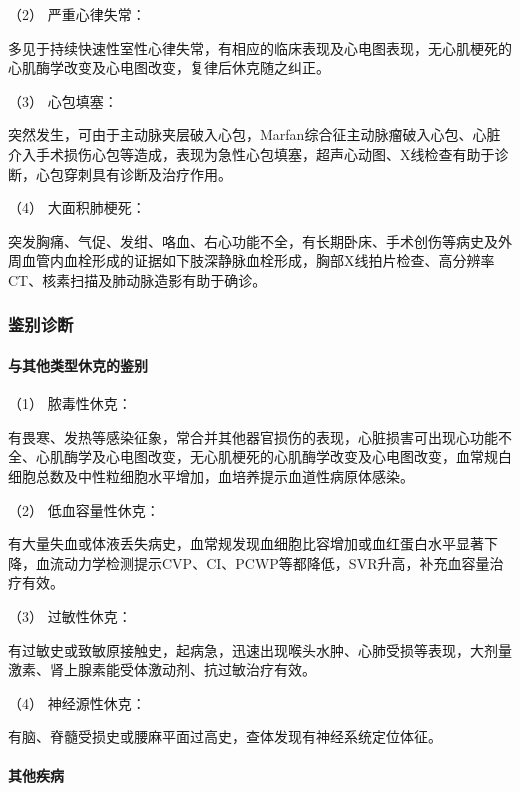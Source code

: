 \hypertarget{text00059.htmlux5cux23CHP2-3-2-3-3-2}{}
（2） 严重心律失常：

多见于持续快速性室性心律失常，有相应的临床表现及心电图表现，无心肌梗死的心肌酶学改变及心电图改变，复律后休克随之纠正。

\hypertarget{text00059.htmlux5cux23CHP2-3-2-3-3-3}{}
（3） 心包填塞：

突然发生，可由于主动脉夹层破入心包，Marfan综合征主动脉瘤破入心包、心脏介入手术损伤心包等造成，表现为急性心包填塞，超声心动图、X线检查有助于诊断，心包穿刺具有诊断及治疗作用。

\hypertarget{text00059.htmlux5cux23CHP2-3-2-3-3-4}{}
（4） 大面积肺梗死：

突发胸痛、气促、发绀、咯血、右心功能不全，有长期卧床、手术创伤等病史及外周血管内血栓形成的证据如下肢深静脉血栓形成，胸部X线拍片检查、高分辨率CT、核素扫描及肺动脉造影有助于确诊。

\subsubsection{鉴别诊断}

\paragraph{与其他类型休克的鉴别}

\hypertarget{text00059.htmlux5cux23CHP2-3-2-4-1-1}{}
（1） 脓毒性休克：

有畏寒、发热等感染征象，常合并其他器官损伤的表现，心脏损害可出现心功能不全、心肌酶学及心电图改变，无心肌梗死的心肌酶学改变及心电图改变，血常规白细胞总数及中性粒细胞水平增加，血培养提示血道性病原体感染。

\hypertarget{text00059.htmlux5cux23CHP2-3-2-4-1-2}{}
（2） 低血容量性休克：

有大量失血或体液丢失病史，血常规发现血细胞比容增加或血红蛋白水平显著下降，血流动力学检测提示CVP、CI、PCWP等都降低，SVR升高，补充血容量治疗有效。

\hypertarget{text00059.htmlux5cux23CHP2-3-2-4-1-3}{}
（3） 过敏性休克：

有过敏史或致敏原接触史，起病急，迅速出现喉头水肿、心肺受损等表现，大剂量激素、肾上腺素能受体激动剂、抗过敏治疗有效。

\hypertarget{text00059.htmlux5cux23CHP2-3-2-4-1-4}{}
（4） 神经源性休克：

有脑、脊髓受损史或腰麻平面过高史，查体发现有神经系统定位体征。

\paragraph{其他疾病}

